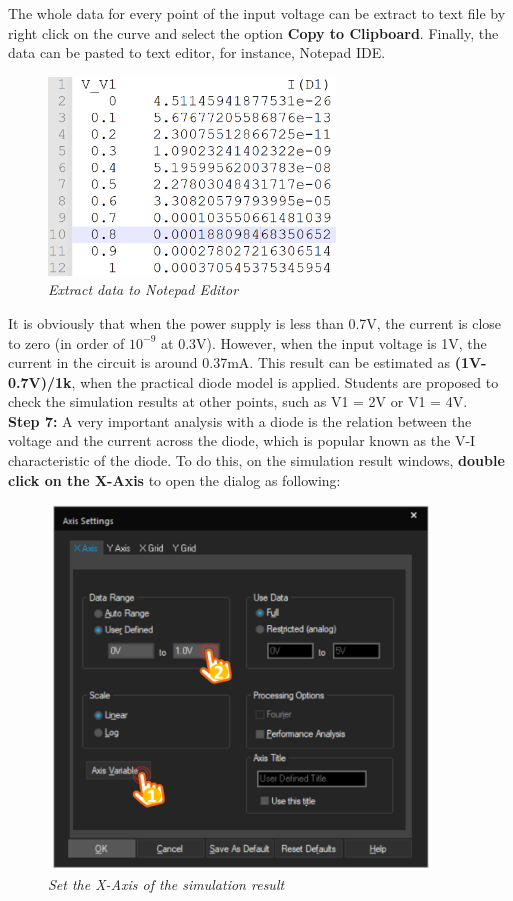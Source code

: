 The whole data for every point of the input voltage can be extract to text file by right click on the curve and select the option \textbf{Copy to Clipboard}. Finally, the data can be pasted to text editor, for instance, Notepad IDE.

\begin{figure}[!htp]
    \centering
    \includegraphics[width=3in]{source/picture/bai_2/diode_3.PNG}
    \caption{\textit{Extract data to Notepad Editor}}
    \label{bai2_pic18a}
\end{figure}

It is obviously that when the power supply is less than 0.7V, the current is close to zero (in order of $10^{-9}$ at 0.3V). However, when the input voltage is 1V, the current in the circuit is around 0.37mA. This result can be estimated as \textbf{(1V-0.7V)/1k}, when the practical diode model is applied. Students are proposed to check the simulation results at other points, such as V1 = 2V or V1 = 4V.\\


\textbf{Step 7: } A very important analysis with a diode is the relation between the voltage and the current across the diode, which is popular known as the V-I characteristic of the diode. To do this, on the simulation result windows, \textbf{double click on the X-Axis} to open the dialog as following:
\newpage
\begin{figure}[!htp]
    \centering
    \includegraphics[width=4in]{source/picture/bai_2/diode_14.PNG}
    \caption{\textit{Set the X-Axis of the simulation result}}
    \label{bai2_pic18b}
\end{figure}

